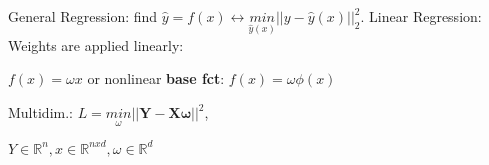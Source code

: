 General Regression: find $\hat{y} = f(x) \leftrightarrow \underset{\hat{y}(x)}{min} ||y - \hat{y}(x)||_2^2$.
Linear Regression: Weights are applied linearly:

$f(x) = \omega x$ or nonlinear \textbf{base fct}: $f(x) = \omega\phi(x)$

Multidim.: $L = \underset{\omega}{min}||\boldsymbol{Y-X\omega||}^2$, 

$Y \in \mathbb{R}^n, x \in \mathbb{R}^{nxd},\omega \in \mathbb{R}^d$






